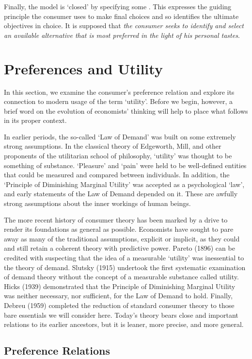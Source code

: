 \documentclass[b5paper]{memoir}
\begin{document}
Finally, the model is ‘closed’ by specifying some . This
expresses the guiding principle the consumer uses to make final choices and so identifies
the ultimate objectives in choice. It is supposed that \emph{the consumer seeks to
identify and select an available alternative that is most preferred in the light of his
personal tastes}.


\section{Preferences and Utility}

In this section, we examine the consumer’s preference relation and explore its connection
to modern usage of the term ‘utility’. Before we begin, however, a brief word on the
evolution of economists’ thinking will help to place what follows in its proper context.

In earlier periods, the so-called ‘Law of Demand’ was built on some extremely strong
assumptions. In the classical theory of Edgeworth, Mill, and other proponents of the
utilitarian school of philosophy, ‘utility’ was thought to be something of substance.
‘Pleasure’ and ‘pain’ were held to be well-defined entities that could be measured and
compared between individuals. In addition, the ‘Principle of Diminishing Marginal Utility’
was accepted as a psychological ‘law’, and early statements of the Law of Demand depended
on it. These are awfully strong assumptions about the inner workings of human beings.

The more recent history of consumer theory has been marked by a drive to render its
foundations as general as possible. Economists have sought to pare away as many of the
traditional assumptions, explicit or implicit, as they could and still retain a coherent
theory with predictive power. Pareto (1896) can be credited with suspecting that the idea
of a measurable ‘utility’ was inessential to the theory of demand. Slutsky (1915)
undertook the first systematic examination of demand theory without the concept of a
measurable substance called utility. Hicks (1939) demonstrated that the Principle of
Diminishing Marginal Utility was neither necessary, nor sufficient, for the Law of Demand
to hold. Finally, Debreu (1959) completed the reduction of standard consumer theory to
those bare essentials we will consider here. Today’s theory bears close and important
relations to its earlier ancestors, but it is leaner, more precise, and more general.

\subsection{Preference Relations}
\end{document}
